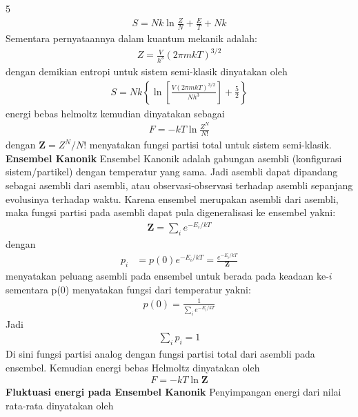 \documentclass[a4paper  , 6 pt]{article}
\begin{document}
\begin{tiny}
\begin{multicols} {5}
\begin{align}
S = Nk \ln \frac{Z}{N} + \frac{E}{T} + Nk 
\end{align}
Sementara pernyataannya dalam kuantum mekanik adalah:
\begin{align}
Z = \frac{V}{h^3} (2 \pi m kT)
^{3/2 }
\end{align}
dengan demikian entropi untuk sistem semi-klasik dinyatakan oleh 
\begin{align}
S = Nk \left \lbrace \ln \left [ \frac{V (2 \pi m kT )^{3/2} }{Nh^3} \right ] +
  \frac{5}{2} \right \rbrace  \nonumber
\end{align}
energi bebas helmoltz kemudian dinyatakan sebagai 
\begin{align}
F = - kT \ln \frac{Z^N}{N!} 
\end{align}
dengan $\boldsymbol{Z} = Z^N /N!$ menyatakan fungsi partisi total untuk sistem semi-klasik. \newline
\textbf{Ensembel Kanonik} \newline
Ensembel Kanonik adalah gabungan asembli (konfigurasi sistem/partikel) dengan temperatur yang sama. Jadi asembli dapat dipandang sebagai asembli dari asembli, atau observasi-observasi terhadap  asembli sepanjang evolusinya terhadap waktu.\newline
Karena ensembel merupakan asembli dari asembli, maka fungsi partisi pada asembli dapat pula digeneralisasi ke ensembel yakni:
\begin{align}
\boldsymbol{Z} = \sum_i e^{- E_i /kT}
\end{align}
dengan 
\begin{align}
p_i &= p(0) e^{-E_i /k T}  = \frac{e^{-E_i /kT}}{\boldsymbol{Z}}   \label{peluang-kanonik}
\end{align}
menyatakan peluang asembli pada ensembel untuk berada pada keadaan ke-$i$ sementara 
p(0) menyatakan fungsi dari temperatur yakni:
\begin{align}
p(0) = \frac{1}{\sum_i e^{- E_i /kT}}
\end{align}
Jadi
\begin{align}
\sum_i p_i = 1 
\end{align}
Di sini fungsi partisi analog dengan fungsi partisi total dari asembli pada ensembel. Kemudian energi bebas Helmoltz dinyatakan oleh
\begin{align}
F = - kT \ln \boldsymbol{Z}
\end{align}
\newline
\textbf{Fluktuasi energi pada Ensembel Kanonik} \newline
Penyimpangan energi dari nilai rata-rata dinyatakan oleh

\end{multicols}
\end{tiny}
\end{document}
